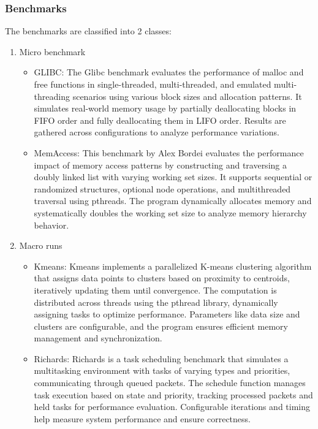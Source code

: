 \documentclass[11pt]{article}
\begin{document}
\subsubsection{Benchmarks}
\label{sec:org91388b2}
The benchmarks are classified into 2 classes:

\begin{enumerate}
\item Micro benchmark
\label{sec:orgf10bbbd}
\begin{itemize}
\item GLIBC: The Glibc benchmark evaluates the performance of
malloc and free functions in single-threaded, multi-threaded,
and emulated multi-threading scenarios using various block sizes and
allocation patterns. It simulates real-world memory usage by partially
deallocating blocks in FIFO order and fully deallocating them in LIFO order.
Results are gathered across configurations to analyze performance variations.
\item MemAccess: This benchmark by Alex Bordei evaluates the performance impact of
memory access patterns by constructing and traversing a doubly
linked list with varying working set sizes. It supports sequential or
randomized structures, optional node operations, and multithreaded
traversal using pthreads. The program dynamically allocates memory and systematically
doubles the working set size to analyze memory hierarchy behavior.
\end{itemize}

\item Macro runs
\label{sec:orgc073fbd}
\begin{itemize}
\item Kmeans: Kmeans implements a parallelized K-means clustering algorithm that
assigns data points to clusters based on proximity to centroids,
iteratively updating them until convergence. The computation is
distributed across threads using the pthread library, dynamically
assigning tasks to optimize performance. Parameters like data size
and clusters are configurable, and the program ensures efficient
memory management and synchronization.
\item Richards: Richards is a task scheduling benchmark that simulates a
multitasking environment with tasks of varying types and priorities,
communicating through queued packets. The schedule function manages
task execution based on state and priority, tracking processed packets
and held tasks for performance evaluation. Configurable iterations and
timing help measure system performance and ensure correctness.
\end{itemize}
\end{enumerate}
\end{document}

